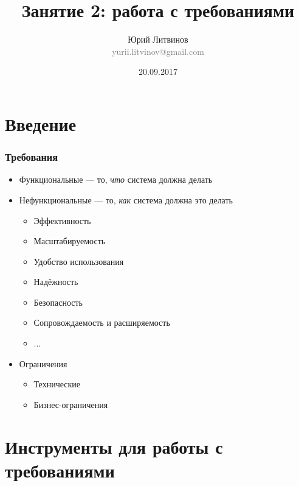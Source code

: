 \documentclass[xetex,mathserif,serif]{beamer}
\title{Занятие 2: работа с требованиями}
\author[Юрий Литвинов]{Юрий Литвинов\\\small{\textcolor{gray}{yurii.litvinov@gmail.com}}}
\date{20.09.2017}
\begin{document}
	\frame{\titlepage}

	\section{Введение}

	\begin{frame}
		\frametitle{Требования}
		\begin{itemize}
			\item Функциональные --- то, \emph{что} система должна делать
			\item Нефункциональные --- то, \emph{как} система должна это делать
			\begin{itemize}
				\item Эффективность
				\item Масштабируемость
				\item Удобство использования
				\item Надёжность
				\item Безопасность
				\item Сопровождаемость и расширяемость
				\item ...
			\end{itemize}
			\item Ограничения
			\begin{itemize}
				\item Технические
				\item Бизнес-ограничения
			\end{itemize}
		\end{itemize}
	\end{frame}

	\section{Инструменты для работы с требованиями}
\end{document}
